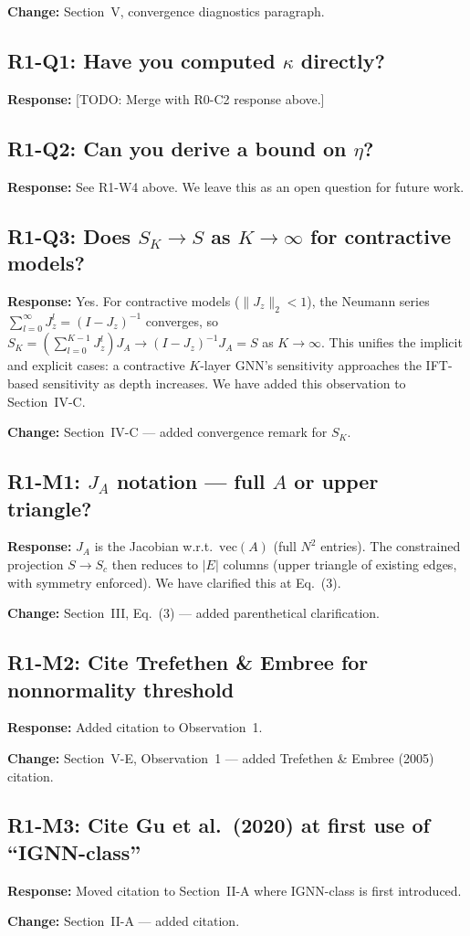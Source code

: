 \documentclass[11pt]{article}
\newcommand{\reviewer}[1]{\subsection*{\textcolor{revcolor}{#1}}}
\newcommand{\response}[1]{\textcolor{responsecolor}{\textbf{Response:} #1}}
\newcommand{\change}[1]{\textcolor{changecolor}{\textbf{Change:} #1}}
\begin{document}
\change{Section~V, convergence diagnostics paragraph.}


\reviewer{R1-Q1: Have you computed $\kappa$ directly?}

\response{[TODO: Merge with R0-C2 response above.]}

\reviewer{R1-Q2: Can you derive a bound on $\eta$?}

\response{See R1-W4 above. We leave this as an open question for future work.}

\reviewer{R1-Q3: Does $S_K \to S$ as $K \to \infty$ for contractive models?}

\response{
Yes. For contractive models ($\|J_z\|_2 < 1$), the Neumann series $\sum_{l=0}^{\infty} J_z^l = (I - J_z)^{-1}$ converges, so $S_K = (\sum_{l=0}^{K-1} J_z^l) J_A \to (I - J_z)^{-1} J_A = S$ as $K \to \infty$. This unifies the implicit and explicit cases: a contractive $K$-layer GNN's sensitivity approaches the IFT-based sensitivity as depth increases. We have added this observation to Section~IV-C.
}

\change{Section~IV-C --- added convergence remark for $S_K$.}


\reviewer{R1-M1: $J_A$ notation --- full $A$ or upper triangle?}

\response{$J_A$ is the Jacobian w.r.t.\ $\mathrm{vec}(A)$ (full $N^2$ entries). The constrained projection $S \to S_c$ then reduces to $|E|$ columns (upper triangle of existing edges, with symmetry enforced). We have clarified this at Eq.~(3).}

\change{Section~III, Eq.~(3) --- added parenthetical clarification.}

\reviewer{R1-M2: Cite Trefethen \& Embree for nonnormality threshold}

\response{Added citation to Observation~1.}

\change{Section~V-E, Observation~1 --- added Trefethen \& Embree (2005) citation.}

\reviewer{R1-M3: Cite Gu et al.\ (2020) at first use of ``IGNN-class''}

\response{Moved citation to Section~II-A where IGNN-class is first introduced.}

\change{Section~II-A --- added citation.}

\end{document}

